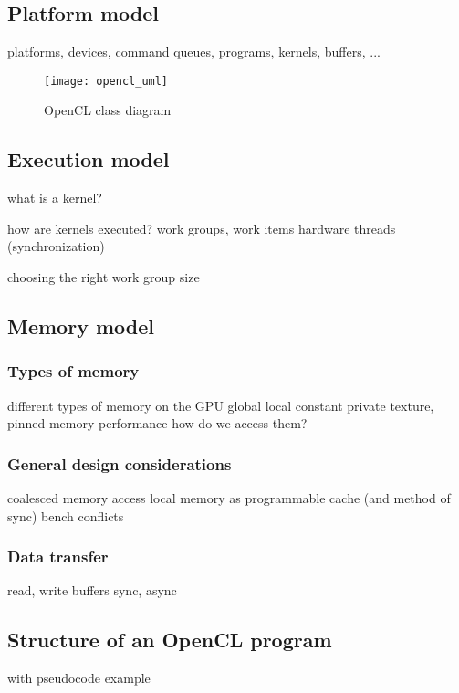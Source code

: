 \subsection{Platform model}
platforms, devices, command queues, programs, kernels, buffers, ...

\begin{figure} %
\centering
\texttt{[image: opencl\_uml]}
\caption{OpenCL class diagram \cite{opencl_spec}}
\label{fig:opencl_uml}
\end{figure}

\subsection{Execution model}
what is a kernel?

how are kernels executed?
work groups, work items
hardware threads (synchronization)

choosing the right work group size


\subsection{Memory model}

\subsubsection{Types of memory}
different types of memory on the GPU
global local constant private
texture, pinned memory
performance
how do we access them?

\subsubsection{General design considerations}
coalesced memory access
local memory as programmable cache (and method of sync)
bench conflicts

\subsubsection{Data transfer}
read, write buffers
sync, async



\subsection{Structure of an OpenCL program}

with pseudocode example

